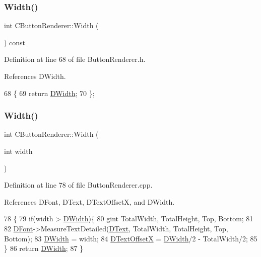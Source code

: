 \subsubsection{\texorpdfstring{Width()}{Width()}\hspace{0.1cm}{\footnotesize\ttfamily [1/2]}}
{\footnotesize\ttfamily int C\+Button\+Renderer\+::\+Width (\begin{DoxyParamCaption}{ }\end{DoxyParamCaption}) const\hspace{0.3cm}{\ttfamily [inline]}}



Definition at line 68 of file Button\+Renderer.\+h.



References D\+Width.


\begin{DoxyCode}
68                          \{
69             \textcolor{keywordflow}{return} \hyperlink{classCButtonRenderer_a5c2ce68af06e91c14cbd1b8dd8bd4b94}{DWidth};
70         \};
\end{DoxyCode}
\hypertarget{classCButtonRenderer_ace9959d559850f1b916e1a949f25e21f}{}\label{classCButtonRenderer_ace9959d559850f1b916e1a949f25e21f} 
\subsubsection{\texorpdfstring{Width()}{Width()}\hspace{0.1cm}{\footnotesize\ttfamily [2/2]}}
{\footnotesize\ttfamily int C\+Button\+Renderer\+::\+Width (\begin{DoxyParamCaption}\item[{int}]{width }\end{DoxyParamCaption})}



Definition at line 78 of file Button\+Renderer.\+cpp.



References D\+Font, D\+Text, D\+Text\+OffsetX, and D\+Width.


\begin{DoxyCode}
78                                    \{
79     \textcolor{keywordflow}{if}(width > \hyperlink{classCButtonRenderer_a5c2ce68af06e91c14cbd1b8dd8bd4b94}{DWidth})\{
80         gint TotalWidth, TotalHeight, Top, Bottom;
81         
82         \hyperlink{classCButtonRenderer_adcdace35cb4fac1c90368b7cc86d860a}{DFont}->MeasureTextDetailed(\hyperlink{classCButtonRenderer_a8f058166dec8d1c73adc009e4c436092}{DText}, TotalWidth, TotalHeight, Top, Bottom);
83         \hyperlink{classCButtonRenderer_a5c2ce68af06e91c14cbd1b8dd8bd4b94}{DWidth} = width;  
84         \hyperlink{classCButtonRenderer_aaeb649ff53e0032e756c53b2f51f3d96}{DTextOffsetX} = \hyperlink{classCButtonRenderer_a5c2ce68af06e91c14cbd1b8dd8bd4b94}{DWidth}/2 - TotalWidth/2;
85     \}
86     \textcolor{keywordflow}{return} \hyperlink{classCButtonRenderer_a5c2ce68af06e91c14cbd1b8dd8bd4b94}{DWidth};
87 \}
\end{DoxyCode}



